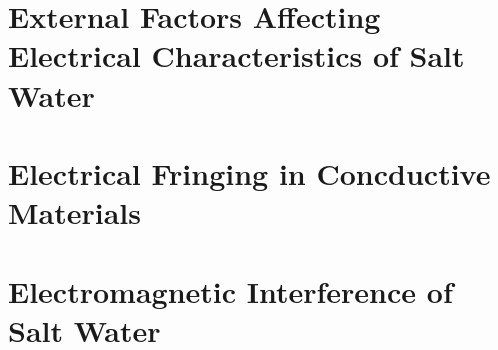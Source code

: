 \section{External Factors Affecting Electrical Characteristics of Salt Water}\label{sec:external-factors-affecting-electrical-characteristics-of-salt-water}

\section{Electrical Fringing in Concductive Materials}

\section{Electromagnetic Interference of Salt Water}

